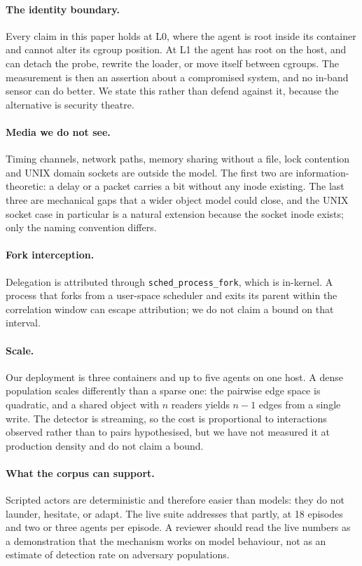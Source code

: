 \documentclass[11pt]{article}
\begin{document}
\paragraph{The identity boundary.} Every claim in this paper holds at L0, where the
agent is root inside its container and cannot alter its cgroup position. At L1 the
agent has root on the host, and can detach the probe, rewrite the loader, or move
itself between cgroups. The measurement is then an assertion about a compromised
system, and no in-band sensor can do better. We state this rather than defend
against it, because the alternative is security theatre.

\paragraph{Media we do not see.} Timing channels, network paths, memory sharing
without a file, lock contention and UNIX domain sockets are outside the model. The
first two are information-theoretic: a delay or a packet carries a bit without any
inode existing. The last three are mechanical gaps that a wider object model could
close, and the UNIX socket case in particular is a natural extension because the
socket inode exists; only the naming convention differs.

\paragraph{Fork interception.} Delegation is attributed through
\texttt{sched\_process\_fork}, which is in-kernel. A process that forks from a
user-space scheduler and exits its parent within the correlation window can escape
attribution; we do not claim a bound on that interval.

\paragraph{Scale.} Our deployment is three containers and up to five agents on one
host. A dense population scales differently than a sparse one: the pairwise edge
space is quadratic, and a shared object with $n$ readers yields $n-1$ edges from a
single write. The detector is streaming, so the cost is proportional to interactions
observed rather than to pairs hypothesised, but we have not measured it at
production density and do not claim a bound.

\paragraph{What the corpus can support.} Scripted actors are deterministic and
therefore easier than models: they do not launder, hesitate, or adapt. The live
suite addresses that partly, at 18 episodes and two or three agents per episode. A
reviewer should read the live numbers as a demonstration that the mechanism works
on model behaviour, not as an estimate of detection rate on adversary populations.
\end{document}
